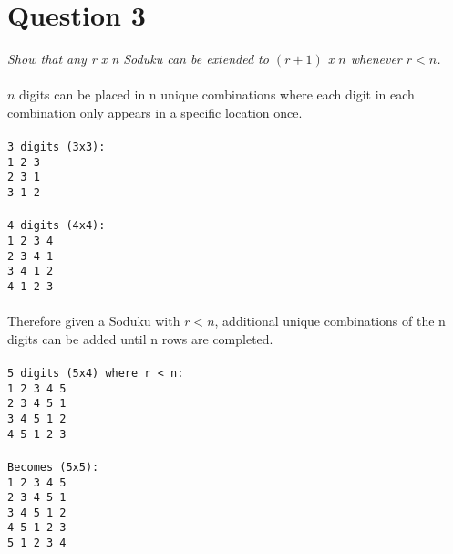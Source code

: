 \documentclass[a4paper, 11pt]{article}
\begin{document}
\section*{Question 3}
\textit{Show that any r x n Soduku can be extended to \((r+1)\) x \(n\) whenever \(r < n\).}
\\
\\
\(n\) digits can be placed in n unique combinations where each digit in each combination only appears in a specific location once.
\\
\\
\texttt{3 digits (3x3):\\
1 2 3\\
2 3 1\\
3 1 2}
\\
\\
\texttt{4 digits (4x4):\\
1 2 3 4\\
2 3 4 1\\
3 4 1 2\\
4 1 2 3}
\\
\\
Therefore given a Soduku with \(r < n\), additional unique combinations of the n digits can be added until n rows are completed.
\\
\\
\texttt{5 digits (5x4) where r < n:\\
1 2 3 4 5\\
2 3 4 5 1\\
3 4 5 1 2\\
4 5 1 2 3}
\\
\\
\texttt{Becomes (5x5):\\
1 2 3 4 5\\
2 3 4 5 1\\
3 4 5 1 2\\
4 5 1 2 3\\
5 1 2 3 4}
\end{document}
